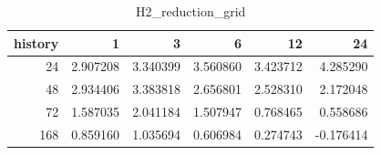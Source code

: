 \begin{table}
\caption{H2_reduction_grid}
\label{tab:H2_reduction_grid}
\begin{tabular}{rrrrrr}
\toprule
history & 1 & 3 & 6 & 12 & 24 \\
\midrule
24 & 2.907208 & 3.340399 & 3.560860 & 3.423712 & 4.285290 \\
48 & 2.934406 & 3.383818 & 2.656801 & 2.528310 & 2.172048 \\
72 & 1.587035 & 2.041184 & 1.507947 & 0.768465 & 0.558686 \\
168 & 0.859160 & 1.035694 & 0.606984 & 0.274743 & -0.176414 \\
\bottomrule
\end{tabular}
\end{table}
